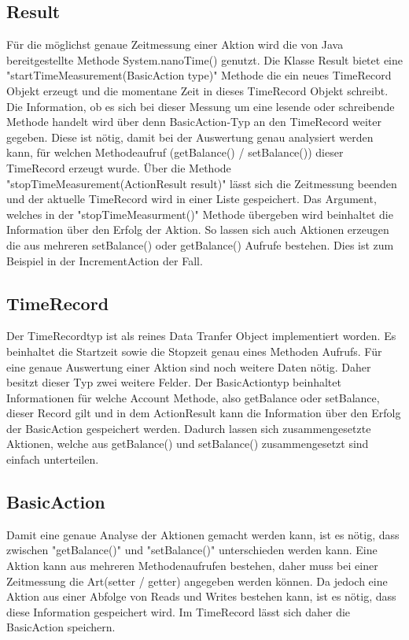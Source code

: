\subsection{Result}
\label{sec:result}
Für die möglichst genaue Zeitmessung einer Aktion wird die von Java bereitgestellte Methode System.nanoTime() genutzt. Die Klasse Result bietet eine "startTimeMeasurement(BasicAction type)" Methode die ein neues TimeRecord Objekt erzeugt und die momentane Zeit in dieses TimeRecord Objekt schreibt. Die Information, ob es sich bei dieser Messung um eine lesende oder schreibende Methode handelt wird über denn BasicAction-Typ an den TimeRecord weiter gegeben. Diese ist nötig, damit bei der Auswertung genau analysiert werden kann, für welchen Methodeaufruf (getBalance() / setBalance()) dieser TimeRecord erzeugt wurde. Über die Methode "stopTimeMeasurement(ActionResult result)" lässt sich die Zeitmessung beenden und der aktuelle TimeRecord wird in einer Liste gespeichert. Das Argument, welches in der "stopTimeMeasurment()" Methode übergeben wird beinhaltet die Information über den Erfolg der Aktion. So lassen sich auch Aktionen erzeugen die aus mehreren setBalance() oder getBalance() Aufrufe bestehen. Dies ist zum Beispiel in der IncrementAction der Fall.

\subsection{TimeRecord}
\label{sec:timeRecord}
Der TimeRecordtyp ist als reines Data Tranfer Object implementiert worden. Es beinhaltet die Startzeit sowie die Stopzeit genau eines Methoden Aufrufs. Für eine genaue Auswertung einer Aktion sind noch weitere Daten nötig. Daher besitzt dieser Typ zwei weitere Felder. Der BasicActiontyp beinhaltet Informationen für welche Account Methode, also getBalance oder setBalance, dieser Record gilt und in dem ActionResult kann die Information über den Erfolg der BasicAction gespeichert werden. Dadurch lassen sich zusammengesetzte Aktionen, welche aus getBalance() und setBalance() zusammengesetzt sind einfach unterteilen.

\subsection{BasicAction}
\label{sec:BasicAction}
Damit eine genaue Analyse der Aktionen ge\-macht werden kann, ist es nö\-tig, dass zwi\-schen "get\-Ba\-lan\-ce()" und "set\-Ba\-lan\-ce()" un\-ter\-schieden wer\-den kann. Eine Aktion kann aus mehreren Methoden\-auf\-rufen bestehen, daher muss bei einer Zeitmessung die Art(setter / getter) angegeben werden können. Da jedoch eine Aktion aus einer Abfolge von Reads und Writes bestehen kann, ist es nötig, dass diese Information gespeichert wird. Im TimeRecord lässt sich daher die BasicAction speichern.

